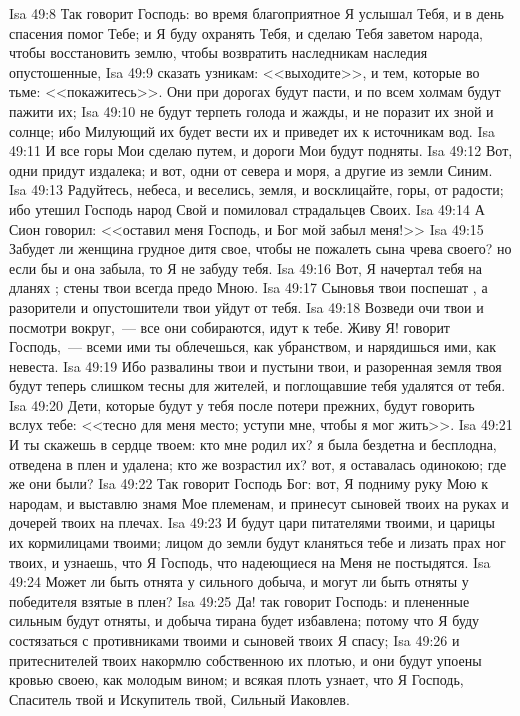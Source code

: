 \rsbpar\vs Isa 49:8 Так говорит Господь: во время благоприятное Я услышал Тебя, и в день спасения помог Тебе; и Я буду охранять Тебя, и сделаю Тебя заветом народа, чтобы восстановить землю, чтобы возвратить наследникам наследия опустошенные,
\vs Isa 49:9 сказать узникам: <<выходите>>, и тем, которые во тьме: <<покажитесь>>. Они при дорогах будут пасти, и по всем холмам будут пажити их;
\vs Isa 49:10 не будут терпеть голода и жажды, и не поразит их зной и солнце; ибо Милующий их будет вести их и приведет их к источникам вод.
\vs Isa 49:11 И все горы Мои сделаю путем, и дороги Мои будут подняты.
\vs Isa 49:12 Вот, одни придут издалека; и вот, одни от севера и моря, а другие из земли Синим.
\vs Isa 49:13 Радуйтесь, небеса, и веселись, земля, и восклицайте, горы, от радости; ибо утешил Господь народ Свой и помиловал страдальцев Своих.
\vs Isa 49:14 А Сион говорил: <<оставил меня Господь, и Бог мой забыл меня!>>
\vs Isa 49:15 Забудет ли женщина грудное дитя свое, чтобы не пожалеть сына чрева своего? но если бы и она забыла, то Я не забуду тебя.
\vs Isa 49:16 Вот, Я начертал тебя на дланях ; стены твои всегда предо Мною.
\vs Isa 49:17 Сыновья твои поспешат , а разорители и опустошители твои уйдут от тебя.
\vs Isa 49:18 Возведи очи твои и посмотри вокруг,~--- все они собираются, идут к тебе. Живу Я! говорит Господь,~--- всеми ими ты облечешься, как убранством, и нарядишься ими, как невеста.
\vs Isa 49:19 Ибо развалины твои и пустыни твои, и разоренная земля твоя будут теперь слишком тесны для жителей, и поглощавшие тебя удалятся от тебя.
\vs Isa 49:20 Дети, которые будут у тебя после потери прежних, будут говорить вслух тебе: <<тесно для меня место; уступи мне, чтобы я мог жить>>.
\vs Isa 49:21 И ты скажешь в сердце твоем: кто мне родил их? я была бездетна и бесплодна, отведена в плен и удалена; кто же возрастил их? вот, я оставалась одинокою; где же они были?
\rsbpar\vs Isa 49:22 Так говорит Господь Бог: вот, Я подниму руку Мою к народам, и выставлю знамя Мое племенам, и принесут сыновей твоих на руках и дочерей твоих на плечах.
\vs Isa 49:23 И будут цари питателями твоими, и царицы их кормилицами твоими; лицом до земли будут кланяться тебе и лизать прах ног твоих, и узнаешь, что Я Господь, что надеющиеся на Меня не постыдятся.
\vs Isa 49:24 Может ли быть отнята у сильного добыча, и могут ли быть отняты у победителя взятые в плен?
\vs Isa 49:25 Да! так говорит Господь: и плененные сильным будут отняты, и добыча тирана будет избавлена; потому что Я буду состязаться с противниками твоими и сыновей твоих Я спасу;
\vs Isa 49:26 и притеснителей твоих накормлю собственною их плотью, и они будут упоены кровью своею, как молодым вином; и всякая плоть узнает, что Я Господь, Спаситель твой и Искупитель твой, Сильный Иаковлев.
